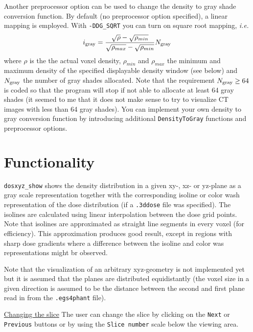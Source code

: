 \documentclass[12pt]{article}
\begin{document}
Another preprocessor option can be used to change the
density to gray shade conversion function. By default
(no preprocessor option specified), a linear mapping
is employed. With {\tt -DDG\_SQRT} you can turn on
square root mapping, {\em i.e.}
\begin{displaymath}
i_{\rm gray} = {\sqrt{\rho} - \sqrt{\rho_{min}} \over
\sqrt{\rho_{max}} - \sqrt{\rho_{min}}} N_{\rm gray}
\end{displaymath}
where $\rho$ is the the actual voxel density, $\rho_{min}$ and
$\rho_{max}$ the minimum and maximum density of the specified
displayable density window (see below) and $N_{\rm gray}$ the
number of gray shades allocated. Note that the
requirement $N_{\rm gray} \ge 64$ is coded so that
the program will stop if not able to allocate at least
64 gray shades (it seemed to me that it does not make sense
to try to visualize CT images with less than 64 gray shades).
You can implement your own density to gray conversion
function by introducing additional {\tt DensityToGray}
functions and preprocessor options.

\section{\sffamily Functionality}

{\tt dosxyz\_show} shows the density distribution
in a given xy-, xz- or yz-plane as a gray scale representation
together with the corresponding isoline or
color wash representation of the dose distribution
(if a {\tt .3ddose} file was specified). The isolines are
calculated using linear interpolation between the dose grid points.
Note that isolines are approximated as straight line segments in
every voxel (for efficiency). This approximation
produces good result, except in regions with sharp dose gradients
where a difference between the isoline and color was representations
might br observed.

\noindent
Note that the visualization of an arbitrary xyz-geometry
is not implemented yet but it is assumed that the planes
are distributed equidistantly (the voxel size in
a given direction is assumed to be the distance between
the second and first plane read in from the {\tt .egs4phant} file).

\noindent
\underline{\sffamily Changing the slice}
The user can change the slice by clicking on the
{\tt Next} or {\tt Previous} buttons or by using
the {\tt Slice number} scale below the viewing area.
\end{document}
